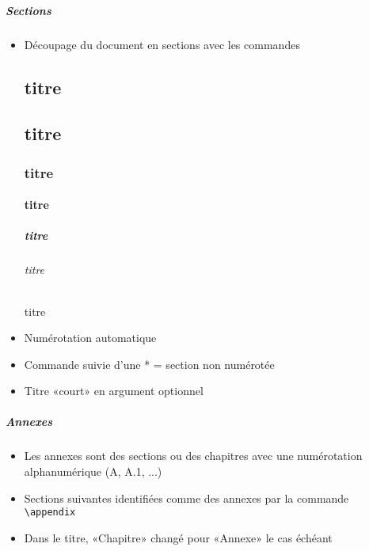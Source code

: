 \begin{frame}[fragile]

	\frametitle{Sections}
	
	\begin{itemize}
		\item Découpage du document en sections avec les commandes
		
		\begin{codesource}
	\part{titre}
	\chapter{titre}
	\section{titre}
	\subsection{titre}
		\end{codesource}
	
		\begin{codesource}
	\subsubsection{titre}		%
		\end{codesource}
	
		\begin{codesource}
	\paragraph{titre}				%
	\subparagraph{titre}		%
		\end{codesource}
	
		\item Numérotation automatique
		\item Commande suivie d’une * = section non numérotée
		\item Titre «court» en argument optionnel
	\end{itemize}
\end{frame}


\begin{frame}[c,fragile]
	
	\frametitle{Annexes}
	
	\begin{itemize}
		\item Les annexes sont des sections ou des chapitres avec une numérotation alphanumérique (A, A.1, ...)
		\item Sections suivantes identifiées comme des annexes par la
		commande \\
		\lstinline|\appendix|
		\item Dans le titre, «Chapitre» changé pour «Annexe» le cas échéant
	\end{itemize}
\end{frame}

